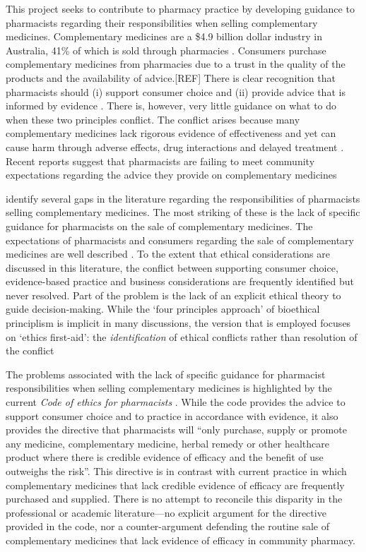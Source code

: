 \documentclass[12pt,]{article}
\begin{document}
This project seeks to contribute to pharmacy practice by developing
guidance to pharmacists regarding their responsibilities when selling
complementary medicines. Complementary medicines are a \$4.9 billion
dollar industry in Australia, 41\% of which is sold through pharmacies
\autocite{ComplementaryMedicinesAustralia2018}. Consumers purchase
complementary medicines from pharmacies due to a trust in the quality of
the products and the availability of advice.{[}REF{]} There is clear
recognition that pharmacists should (i) support consumer choice and (ii)
provide advice that is informed by evidence
\autocites{InternationalPharmaceuticalFederation2014}{PSA2017}. There
is, however, very little guidance on what to do when these two
principles conflict. The conflict arises because many complementary
medicines lack rigorous evidence of effectiveness and yet can cause harm
through adverse effects, drug interactions and delayed treatment
\autocites{Myers2004}{Izzo2009}. Recent reports suggest that pharmacists
are failing to meet community expectations regarding the advice they
provide on complementary medicines
\autocites{Bray2017}{Thompson2017}{Arnold2016}[.][]{King2017}

\textcite{SalmanPopattia2018} identify several gaps in the literature
regarding the responsibilities of pharmacists selling complementary
medicines. The most striking of these is the lack of specific guidance
for pharmacists on the sale of complementary medicines. The expectations
of pharmacists and consumers regarding the sale of complementary
medicines are well described
\autocites{Iyer2016a}{Tran:2013kh}{Kanjanarach2011}. To the extent that
ethical considerations are discussed in this literature, the conflict
between supporting consumer choice, evidence-based practice and business
considerations are frequently identified but never resolved. Part of the
problem is the lack of an explicit ethical theory to guide
decision-making. While the `four principles approach' of bioethical
principlism is implicit in many discussions, the version that is
employed focuses on `ethics first-aid': the \emph{identification} of
ethical conflicts rather than resolution of the conflict
\autocites{Beauchamp2012}{Pullman2005}

The problems associated with the lack of specific guidance for
pharmacist responsibilities when selling complementary medicines is
highlighted by the current \emph{Code of ethics for pharmacists}
\autocite{PSA2017}. While the code provides the advice to support
consumer choice and to practice in accordance with evidence, it also
provides the directive that pharmacists will ``only purchase, supply or
promote any medicine, complementary medicine, herbal remedy or other
healthcare product where there is credible evidence of efficacy and the
benefit of use outweighs the risk''. This directive is in contrast with
current practice in which complementary medicines that lack credible
evidence of efficacy are frequently purchased and supplied. There is no
attempt to reconcile this disparity in the professional or academic
literature---no explicit argument for the directive provided in the
code, nor a counter-argument defending the routine sale of complementary
medicines that lack evidence of efficacy in community pharmacy.
\end{document}
